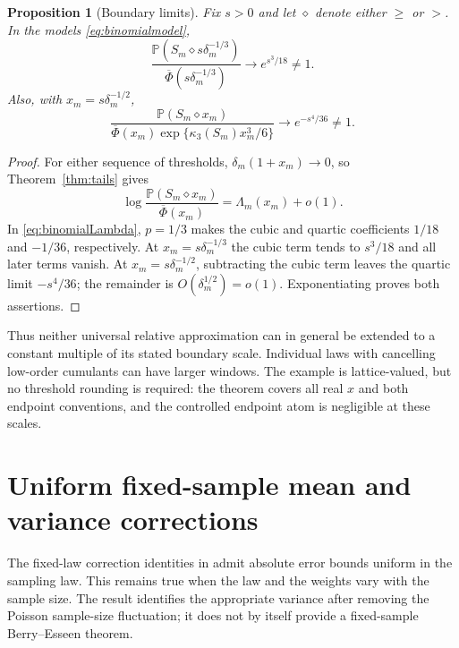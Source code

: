 \documentclass[11pt]{article}
\numberwithin{equation}{section}
\newtheorem{proposition}[theorem]{Proposition}
\theoremstyle{remark}
\newcommand{\Pp}{\mathbb P}
\newcommand{\Phibar}{\overline\Phi}
\begin{document}
\begin{proposition}[Boundary limits]\label{prop:windows}
Fix $s>0$ and let $\diamond$ denote either $\ge$ or $>$. In the models
\eqref{eq:binomialmodel},
\begin{equation}\label{eq:gaussianboundary}
 \frac{\Pp(S_m\diamond s\delta_m^{-1/3})}
 {\Phibar(s\delta_m^{-1/3})}
 \longrightarrow e^{s^3/18}\ne1.
\end{equation}
Also, with $x_m=s\delta_m^{-1/2}$,
\begin{equation}\label{eq:cubicboundary}
 \frac{\Pp(S_m\diamond x_m)}
 {\Phibar(x_m)\exp\{\kappa_3(S_m)x_m^3/6\}}
 \longrightarrow e^{-s^4/36}\ne1.
\end{equation}
\end{proposition}
\begin{proof}
For either sequence of thresholds, $\delta_m(1+x_m)\to0$, so
Theorem~\ref{thm:tails} gives
\[
 \log\frac{\Pp(S_m\diamond x_m)}{\Phibar(x_m)}
 =\Lambda_m(x_m)+o(1).
\]
In \eqref{eq:binomialLambda}, $p=1/3$ makes the cubic and quartic
coefficients $1/18$ and $-1/36$, respectively. At
$x_m=s\delta_m^{-1/3}$ the cubic term tends to $s^3/18$ and all later
terms vanish. At $x_m=s\delta_m^{-1/2}$, subtracting the cubic term leaves
the quartic limit $-s^4/36$; the remainder is
$O(\delta_m^{1/2})=o(1)$. Exponentiating proves both assertions.
\end{proof}

Thus neither universal relative approximation can in general be extended
to a constant multiple of its stated boundary scale. Individual laws with
cancelling low-order cumulants can have larger windows. The example is
lattice-valued, but no threshold rounding is required: the theorem covers
all real $x$ and both endpoint conventions, and the controlled endpoint
atom is negligible at these scales.

\section{Uniform fixed-sample mean and variance corrections}
\label{sec:uniform-correction}

The fixed-law correction identities in \cite[Section~6]{LongFoundation}
admit absolute error bounds uniform in the sampling law. This remains true
when the law and the weights vary with the sample size. The result identifies the appropriate variance after
removing the Poisson sample-size fluctuation; it does not by itself provide
a fixed-sample Berry--Esseen theorem.
\end{document}
